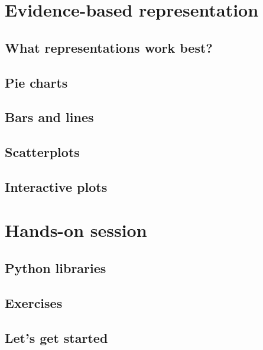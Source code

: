 \section{Evidence-based representation}
\subsection{What representations work best?}

\subsection{Pie charts}

\subsection{Bars and lines}

\subsection{Scatterplots}

\subsection{Interactive plots}


\section{Hands-on session}
\subsection{Python libraries}
%
\subsection{Exercises}

\subsection{Let's get started}



%

%



